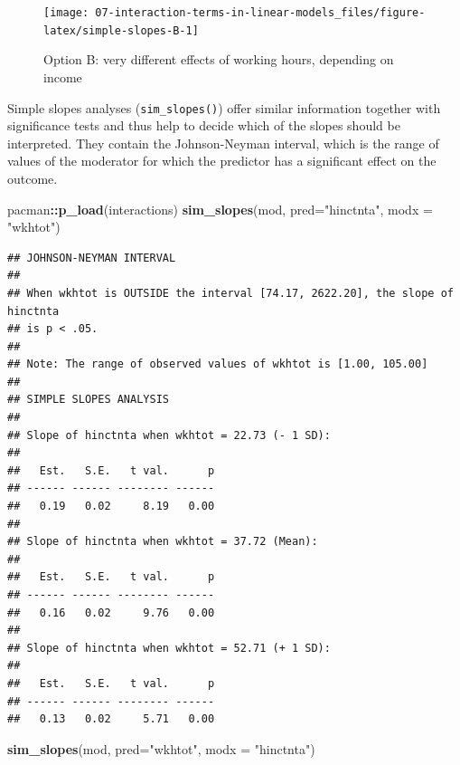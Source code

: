 \documentclass[
]{book}
\newenvironment{Shaded}{\begin{snugshade}}{\end{snugshade}}
\newcommand{\DataTypeTok}[1]{\textcolor[rgb]{0.13,0.29,0.53}{#1}}
\newcommand{\KeywordTok}[1]{\textcolor[rgb]{0.13,0.29,0.53}{\textbf{#1}}}
\newcommand{\NormalTok}[1]{#1}
\newcommand{\OperatorTok}[1]{\textcolor[rgb]{0.81,0.36,0.00}{\textbf{#1}}}
\newcommand{\StringTok}[1]{\textcolor[rgb]{0.31,0.60,0.02}{#1}}
\begin{document}
\begin{figure}

{\centering \texttt{[image: 07-interaction-terms-in-linear-models\_files/figure-latex/simple-slopes-B-1]} 

}

\caption{Option B: very different effects of working hours, depending on income}\label{fig:simple-slopes-B}
\end{figure}

Simple slopes analyses (\texttt{sim\_slopes()}) offer similar information together with significance tests and thus help to decide which of the slopes should be interpreted. They contain the Johnson-Neyman interval, which is the range of values of the moderator for which the predictor has a significant effect on the outcome.

\begin{Shaded}
\begin{Highlighting}[]
\NormalTok{pacman}\OperatorTok{::}\KeywordTok{p_load}\NormalTok{(interactions)}
\KeywordTok{sim_slopes}\NormalTok{(mod, }\DataTypeTok{pred=}\StringTok{"hinctnta"}\NormalTok{, }\DataTypeTok{modx =} \StringTok{"wkhtot"}\NormalTok{)}
\end{Highlighting}
\end{Shaded}

\begin{verbatim}
## JOHNSON-NEYMAN INTERVAL 
## 
## When wkhtot is OUTSIDE the interval [74.17, 2622.20], the slope of hinctnta
## is p < .05.
## 
## Note: The range of observed values of wkhtot is [1.00, 105.00]
## 
## SIMPLE SLOPES ANALYSIS 
## 
## Slope of hinctnta when wkhtot = 22.73 (- 1 SD): 
## 
##   Est.   S.E.   t val.      p
## ------ ------ -------- ------
##   0.19   0.02     8.19   0.00
## 
## Slope of hinctnta when wkhtot = 37.72 (Mean): 
## 
##   Est.   S.E.   t val.      p
## ------ ------ -------- ------
##   0.16   0.02     9.76   0.00
## 
## Slope of hinctnta when wkhtot = 52.71 (+ 1 SD): 
## 
##   Est.   S.E.   t val.      p
## ------ ------ -------- ------
##   0.13   0.02     5.71   0.00
\end{verbatim}

\begin{Shaded}
\begin{Highlighting}[]
\KeywordTok{sim_slopes}\NormalTok{(mod, }\DataTypeTok{pred=}\StringTok{"wkhtot"}\NormalTok{, }\DataTypeTok{modx =} \StringTok{"hinctnta"}\NormalTok{)}
\end{Highlighting}
\end{Shaded}
\end{document}
